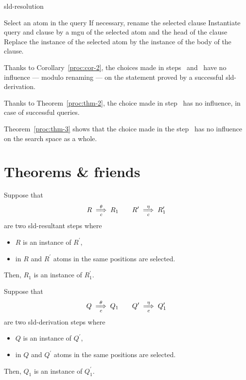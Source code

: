 \begin{algorithm}
    \caption{\gls{sld}-resolution \label{alg:sld}}
    \begin{algorithmic}[1]
      \Statex
      \State Select an atom in the query\label{sld:ch-1}
      \State If necessary, rename the selected clause\label{sld:ch-2}
      \State Instantiate query and clause by a \gls{mgu} of the selected atom and the head of the clause\label{sld:ch-3}
      \State Replace the instance of the selected atom by the instance of the body of the clause.\label{sld:ch-4}
    \end{algorithmic}
  \end{algorithm}

  \begin{rem}
      Thanks to Corollary~\ref{proc:cor-2}, the choices made in steps~ and~ have no influence --- modulo renaming --- on the statement proved by a successful \gls{sld}-derivation.

      Thanks to Theorem~\ref{proc:thm-2}, the choice made in step~ has no influence, in case of successful queries.

      Theorem~\ref{proc:thm-3} shows that the choice made in the step~ has no influence on the search space as a whole.
  \end{rem}

  \section{Theorems \& friends}

  \begin{lem}
    \label{proc:lem-1}
      Suppose that
      \begin{equation*}
          R \underset{c}{\overset{\theta}{\implies}}R_1 \qquad R^\prime \underset{c}{\overset{\eta}{\implies}}R_1^\prime
      \end{equation*}
      are two \gls{sld}-resultant steps where
      \begin{itemize}
          \item \(R\) is an instance of \(R^\prime\),
          \item in \(R\) and \(R^\prime\) atoms in the same positions are selected.
      \end{itemize}
      Then, \(R_1\) is an instance of \(R_1^\prime\).
  \end{lem}

  \begin{cor}
    Suppose that
    \begin{equation*}
        Q \underset{c}{\overset{\theta}{\implies}}Q_1 \qquad Q^\prime \underset{c}{\overset{\eta}{\implies}}Q_1^\prime
    \end{equation*}
    are two \gls{sld}-derivation steps where
    \begin{itemize}
        \item \(Q\) is an instance of \(Q^\prime\),
        \item in \(Q\) and \(Q^\prime\) atoms in the same positions are selected.
    \end{itemize}
    Then, \(Q_1\) is an instance of \(Q_1^\prime\).
  \end{cor}

